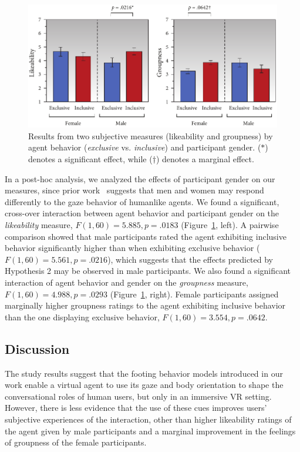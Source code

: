 \begin{figure}
\centering
\includegraphics[width=1\textwidth]{conversationalrolegaze/Figures/ResultsSubjectiveGender.pdf}
\caption{Results from two subjective measures (likeability and groupness) by agent behavior (\emph{exclusive} vs. \emph{inclusive}) and participant gender. ($*$) denotes a significant effect, while ($\dagger$) denotes a marginal effect.}
\label{fig:GazeFootingSubjectiveGender}
\end{figure}

In a post-hoc analysis, we analyzed the effects of participant gender on our measures, since prior work~\citep{mutlu2006storytelling,bailenson2001equilibrium} suggests that men and women may respond differently to the gaze behavior of humanlike agents. We found a significant, cross-over interaction between agent behavior and participant gender on the \emph{likeability} measure, $F(1, 60) = 5.885, p = .0183$ (Figure~\ref{fig:GazeFootingSubjectiveGender}, left). A pairwise comparison showed that male participants rated the agent exhibiting inclusive behavior significantly higher than when exhibiting exclusive behavior ($F(1, 60) = 5.561, p = .0216$), which suggests that the effects predicted by Hypothesis 2 may be observed in male participants. We also found a significant interaction of agent behavior and gender on the \emph{groupness} measure, $F(1, 60) = 4.988, p = .0293$ (Figure~\ref{fig:GazeFootingSubjectiveGender}, right). Female participants assigned marginally higher groupness ratings to the agent exhibiting inclusive behavior than the one displaying exclusive behavior, $F(1, 60) = 3.554, p = .0642$.

\subsection{Discussion}

The study results suggest that the footing behavior models introduced in our work enable a virtual agent to use its gaze and body orientation to shape the conversational roles of human users, but only in an immersive VR setting. However, there is less evidence that the use of these cues improves users' subjective experiences of the interaction, other than higher likeability ratings of the agent given by male participants and a marginal improvement in the feelings of groupness of the female participants.

